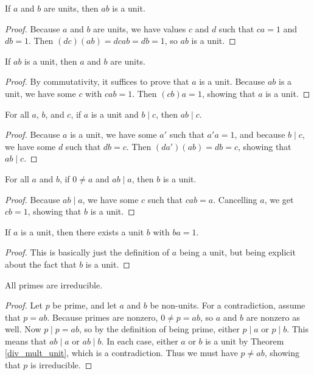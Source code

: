 \documentclass[../../math.tex]{subfiles}
\begin{document}
\begin{theorem} \label{unit_mult}
    If $a$ and $b$ are units, then $ab$ is a unit.
\end{theorem}
\begin{proof}
    Because $a$ and $b$ are units, we have values $c$ and $d$ such that $ca = 1$
    and $db = 1$.  Then $(dc)(ab) = dcab = db = 1$, so $ab$ is a unit.
\end{proof}

\begin{theorem} \label{lmult_unit} \label{rmult_unit}
    If $ab$ is a unit, then $a$ and $b$ are units.
\end{theorem}
\begin{proof}
    By commutativity, it suffices to prove that $a$ is a unit.  Because $ab$ is
    a unit, we have some $c$ with $cab = 1$.  Then $(cb)a = 1$, showing that $a$
    is a unit.
\end{proof}

\begin{theorem} \label{div_unit_mult}
    For all $a$, $b$, and $c$, if $a$ is a unit and $b \mid c$, then $ab \mid
    c$.
\end{theorem}
\begin{proof}
    Because $a$ is a unit, we have some $a'$ such that $a'a = 1$, and because $b
    \mid c$, we have some $d$ such that $db = c$.  Then $(da')(ab) = db = c$,
    showing that $ab \mid c$.
\end{proof}

\begin{theorem} \label{div_mult_unit}
    For all $a$ and $b$, if $0 \neq a$ and $ab \mid a$, then $b$ is a unit.
\end{theorem}
\begin{proof}
    Because $ab \mid a$, we have some $c$ such that $cab = a$.  Cancelling $a$,
    we get $cb = 1$, showing that $b$ is a unit.
\end{proof}

\begin{theorem} \label{unit_ex}
    If $a$ is a unit, then there exists a unit $b$ with $ba = 1$.
\end{theorem}
\begin{proof}
    This is basically just the definition of $a$ being a unit, but being
    explicit about the fact that $b$ is a unit.
\end{proof}

\begin{theorem} \label{prime_irreducible}
    All primes are irreducible.
\end{theorem}
\begin{proof}
    Let $p$ be prime, and let $a$ and $b$ be non-units.  For a contradiction,
    assume that $p = ab$.  Because primes are nonzero, $0 \neq p = ab$, so $a$
    and $b$ are nonzero as well.  Now $p \mid p = ab$, so by the definition of
    being prime, either $p \mid a$ or $p \mid b$.  This means that $ab \mid a$
    or $ab \mid b$.  In each case, either $a$ or $b$ is a unit by Theorem
    \ref{div_mult_unit}, which is a contradiction.  Thus we must have $p \neq
    ab$, showing that $p$ is irreducible.
\end{proof}
\end{document}
